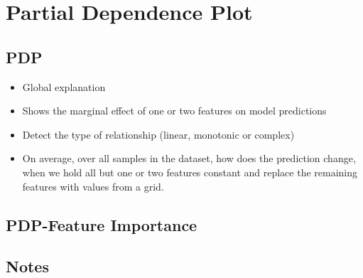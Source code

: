 \section{Partial Dependence Plot}
\subsection{PDP}
\begin{itemize}
	\item Global explanation
	\item Shows the marginal effect of one or two features on model predictions
	\item Detect the type of relationship (linear, monotonic or complex)
	\item On average, over all samples in the dataset, how does the prediction change,
	      when we hold all but one or two features constant and replace the remaining features with values from a grid.
\end{itemize}







\subsection{PDP-Feature Importance}


\subsection{Notes}





